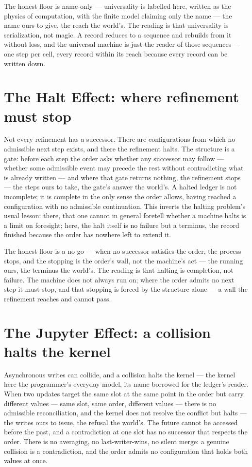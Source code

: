 The honest floor is name-only --- universality is labelled here, written as the physics of computation, with
the finite model claiming only the name --- the name ours to give, the reach the world's. The reading is that
universality is serialization, not magic. A record
reduces to a sequence and rebuilds from it without loss, and the universal machine is just the reader of those
sequences --- one step per cell, every record within its reach because every record can be written down.

\section{The Halt Effect: where refinement must stop}
\label{se:halt}

Not every refinement has a successor. There are configurations from which no admissible next step exists, and
there the refinement halts. The structure is a gate: before each step the order asks whether any successor may
follow --- whether some admissible event may precede the rest without contradicting what is already written ---
and where that gate returns nothing, the refinement stops --- the steps ours to take, the gate's answer the
world's. A halted ledger is not incomplete; it is complete in
the only sense the order allows, having reached a configuration with no admissible continuation. This inverts
the halting problem's usual lesson: there, that one cannot in general foretell whether a machine halts is
a limit on foresight; here, the halt itself is no failure but a terminus, the record finished because the order
has nowhere left to extend it.

The honest floor is a no-go --- when no successor satisfies the order, the process stops, and the stopping is
the order's wall, not the machine's act --- the running ours, the terminus the world's. The reading is that
halting is completion, not failure. The machine does not always run on;
where the order admits no next step it must stop, and that stopping is forced by the structure alone --- a
wall the refinement reaches and cannot pass.

\section{The Jupyter Effect: a collision halts the kernel}
\label{se:jupyter}

Asynchronous writes can collide, and a collision halts the kernel --- the kernel here the programmer's
everyday model, its name borrowed for the ledger's reader. When two updates target the same slot at the
same point in the order but carry different values --- same slot, same order, different values --- there is no
admissible reconciliation, and the kernel does not resolve the conflict but halts --- the writes ours to
issue, the refusal the world's. The future cannot be
accessed before the past, and a contradiction at one slot has no successor that respects the order. There is no
averaging, no last-writer-wins, no silent merge: a genuine collision is a contradiction, and the order admits
no configuration that holds both values at once.

